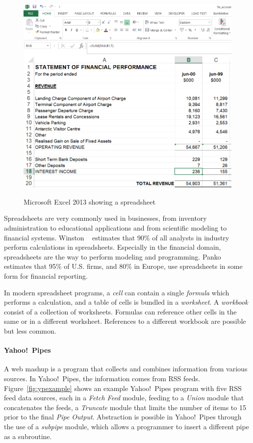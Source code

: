 \documentclass[10pt,conference,compsocconf]{IEEEtran}
\begin{document}
\begin{figure}
\caption{Microsoft Excel 2013 showing a spreadsheet}
\centering
\includegraphics[width=\columnwidth]{excel-2}
\label{fig:spreadsheetexample}
\end{figure}

Spreadsheets are very commonly used in businesses, from inventory administration to educational applications and from scientific modeling to financial systems. Winston ~\cite{Wins2001} estimates that 90\% of all analysts in industry perform calculations in spreadsheets. Especially in the financial domain, spreadsheets are the way to perform modeling and programming. Panko~\cite{Pank2006} estimates that 95\% of U.S. firms, and 80\% in Europe, use spreadsheets in some form for financial reporting. 

In modern spreadsheet programs, a \textit{cell} can contain a single \textit{formula} which performs a calculation, and a table of cells is bundled in a \textit{worksheet}.
A \textit{workbook} consist of a collection of worksheets.
Formulas can reference other cells in the same or in a different worksheet.
References to a different workbook are possible but less common.


\paragraph{Yahoo!\ Pipes}
A web mashup is a program that collects and combines information from various
sources. 
In  Yahoo!\ Pipes, the information comes from RSS feeds. Figure~\ref{fig:ypexample} shows an example Yahoo!\ Pipes program with five RSS feed data sources, each in a \emph{Fetch Feed} module, feeding to a \emph{Union} module that concatenates the feeds, a \emph{Truncate} module that limits the number of items to 15 prior to the final \emph{Pipe Output}. 
Abstraction is possible in Yahoo!\ Pipes through the use of a \emph{subpipe} module, which allows a programmer to insert a different pipe as a subroutine. 
\end{document}

